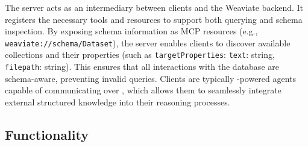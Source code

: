 The server acts as an intermediary between clients and the Weaviate backend. It registers the necessary tools and resources to support both querying and schema inspection. By exposing schema information as MCP resources (e.g., \texttt{weaviate://schema/Dataset}), the server enables clients to discover available collections and their properties (such as \texttt{targetProperties}: {\texttt{text}: string, \texttt{filepath}: string}). This ensures that all interactions with the database are schema-aware, preventing invalid queries. Clients are typically -powered agents capable of communicating over , which allows them to seamlessly integrate external structured knowledge into their reasoning processes.


\subsection{Functionality}
